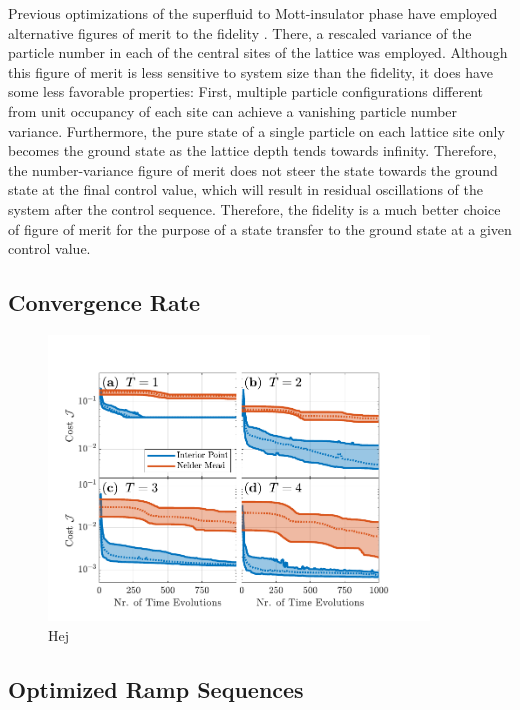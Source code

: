 Previous optimizations of the superfluid to Mott-insulator phase have employed alternative figures of merit to the fidelity \cite{Doria2011,FrankBloch}. There, a rescaled variance of the particle number in each of the central sites of the lattice was employed. Although this figure of merit is less sensitive to system size than the fidelity, it does have some less favorable properties: First, multiple particle configurations different from unit occupancy of each site can achieve a vanishing particle number variance. Furthermore, the pure state of a single particle on each lattice site only becomes the ground state as the lattice depth tends towards infinity. Therefore, the number-variance figure of merit does not steer the state towards the ground state at the final control value, which will result in residual oscillations of the system after the control sequence. Therefore, the fidelity is a much better choice of figure of merit for the purpose of a state transfer to the ground state at a given control value.


\subsection{Convergence Rate}

\begin{figure}[h!]
    \centering
    \includegraphics[width=0.9\textwidth]{Figures/L5/CostProgress.pdf}
    \caption{Hej}
    \label{fig:CostProgress}
\end{figure}

\subsection{Optimized Ramp Sequences}

